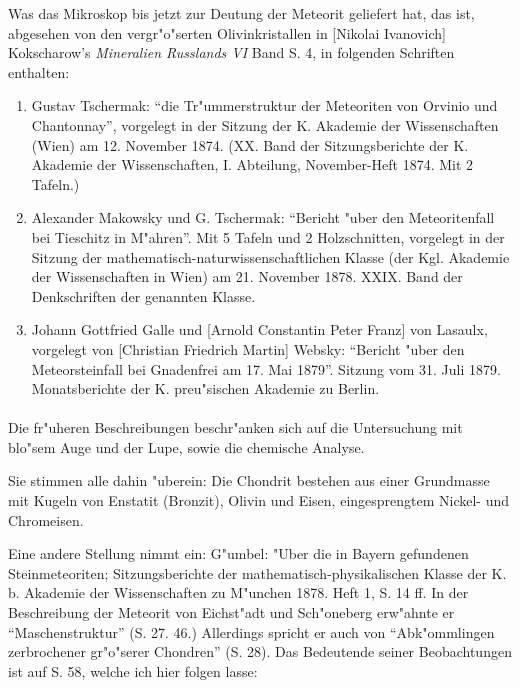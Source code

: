 \documentclass[a4paper, 11pt, oneside]{article}
\begin{document}
Was das Mikroskop bis jetzt zur Deutung der Meteorit geliefert hat, das ist, abgesehen von den vergr"o"serten Olivinkristallen in [Nikolai Ivanovich] Kokscharow's \emph{Mineralien Russlands VI} Band S. 4, in folgenden Schriften enthalten:
\begin{enumerate}
\item Gustav Tschermak: "`die Tr"ummerstruktur der Meteoriten von Orvinio und Chantonnay"', vorgelegt in der Sitzung der K. Akademie der Wissenschaften (Wien) am 12. November 1874. (XX. Band der Sitzungsberichte der K. Akademie der Wissenschaften, I. Abteilung, November-Heft 1874. Mit 2 Tafeln.)
\item Alexander Makowsky und G. Tschermak: "`Bericht "uber den Meteoritenfall bei Tieschitz in M"ahren"'. Mit 5 Tafeln und 2 Holzschnitten, vorgelegt in der Sitzung der mathematisch-naturwissenschaftlichen Klasse (der Kgl. Akademie der Wissenschaften in Wien) am 21. November 1878. XXIX. Band der Denkschriften der genannten Klasse.
\item Johann Gottfried Galle und [Arnold Constantin Peter Franz] von Lasaulx, vorgelegt von [Christian Friedrich Martin] Websky: "`Bericht "uber den Meteorsteinfall bei Gnadenfrei am 17. Mai 1879"'. Sitzung vom 31. Juli 1879. Monatsberichte der K. preu"sischen Akademie zu Berlin.
\end{enumerate}
\paragraph{}
Die fr"uheren Beschreibungen beschr"anken sich auf die Untersuchung mit blo"sem Auge und der Lupe, sowie die chemische Analyse.

Sie stimmen alle dahin "uberein: Die Chondrit bestehen aus einer Grundmasse mit Kugeln von Enstatit (Bronzit), Olivin und Eisen, eingesprengtem Nickel- und Chromeisen.

Eine andere Stellung nimmt ein: G"umbel: "Uber die in Bayern gefundenen Steinmeteoriten; Sitzungsberichte der mathematisch-physikalischen Klasse der K. b. Akademie der Wissenschaften zu M"unchen 1878. Heft 1, S. 14 ff. In der Beschreibung der Meteorit von Eichst"adt und Sch"oneberg erw"ahnte er "`Maschenstruktur"' (S. 27. 46.) Allerdings spricht er auch von "`Abk"ommlingen zerbrochener gr"o"serer Chondren"' (S. 28). Das Bedeutende seiner Beobachtungen ist auf S. 58, welche ich hier folgen lasse:
\end{document}
